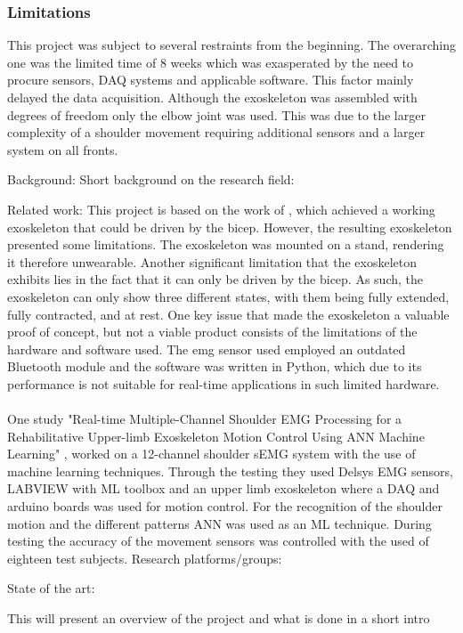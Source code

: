 \subsubsection{Limitations}
This project was subject to several restraints from the beginning. The overarching one was the limited time of 8 weeks which was
exasperated by the need to procure sensors, DAQ systems and applicable software. This factor mainly delayed the data acquisition. 
Although the exoskeleton was assembled with degrees of freedom only the elbow joint was used. This was due to the larger complexity 
of a shoulder movement requiring additional sensors and a larger system on all fronts.


Background: 
    Short background on the research field:

    Related work: %
        This project is based on the work of \cite{AFES}, which achieved a working exoskeleton that could be driven by the bicep. However, the resulting 
        exoskeleton presented some limitations. The exoskeleton was mounted on a stand, rendering it therefore unwearable. Another significant limitation 
        that the exoskeleton exhibits lies in the fact that it can only be driven by the bicep. As such, the exoskeleton can only show three different states, 
        with them being fully extended, fully contracted, and at rest. One key issue that made the exoskeleton a valuable proof of concept, but not a viable 
        product consists of the limitations of the hardware and software used. The \acs{emg} sensor used employed an outdated Bluetooth module and the software was 
        written in Python, which due to its performance is not suitable for real-time applications in such limited hardware. 
        \\\\
        One study "Real-time Multiple-Channel Shoulder EMG Processing for a Rehabilitative Upper-limb Exoskeleton Motion Control Using ANN Machine Learning" \cite{shoulderexo},
        worked on a 12-channel shoulder sEMG system with the use of machine learning techniques. Through the testing they used Delsys EMG sensors, LABVIEW with ML toolbox and an 
        upper limb exoskeleton where a DAQ and arduino boards was used for motion control. For the recognition of the shoulder motion and the different patterns ANN was used as an 
        ML technique. During testing the accuracy of the movement sensors was controlled with the used of eighteen test subjects.
    Research platforms/groups:

    State of the art:


    This will present an overview of the project and what is done in a short intro

